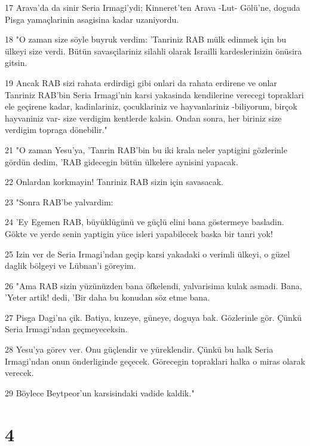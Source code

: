 \par 17 Arava'da da sinir Seria Irmagi'ydi; Kinneret'ten Arava -Lut- Gölü'ne, doguda Pisga yamaçlarinin asagisina kadar uzaniyordu.
\par 18 "O zaman size söyle buyruk verdim: 'Tanriniz RAB mülk edinmek için bu ülkeyi size verdi. Bütün savasçilariniz silahli olarak Israilli kardeslerinizin önüsira gitsin.
\par 19 Ancak RAB sizi rahata erdirdigi gibi onlari da rahata erdirene ve onlar Tanriniz RAB'bin Seria Irmagi'nin karsi yakasinda kendilerine verecegi topraklari ele geçirene kadar, kadinlariniz, çocuklariniz ve hayvanlariniz -biliyorum, birçok hayvaniniz var- size verdigim kentlerde kalsin. Ondan sonra, her biriniz size verdigim topraga dönebilir."
\par 21 "O zaman Yesu'ya, 'Tanrin RAB'bin bu iki krala neler yaptigini gözlerinle gördün dedim, 'RAB gidecegin bütün ülkelere aynisini yapacak.
\par 22 Onlardan korkmayin! Tanriniz RAB sizin için savasacak.
\par 23 "Sonra RAB'be yalvardim:
\par 24 'Ey Egemen RAB, büyüklügünü ve güçlü elini bana göstermeye basladin. Gökte ve yerde senin yaptigin yüce isleri yapabilecek baska bir tanri yok!
\par 25 Izin ver de Seria Irmagi'ndan geçip karsi yakadaki o verimli ülkeyi, o güzel daglik bölgeyi ve Lübnan'i göreyim.
\par 26 "Ama RAB sizin yüzünüzden bana öfkelendi, yalvarisima kulak asmadi. Bana, 'Yeter artik! dedi, 'Bir daha bu konudan söz etme bana.
\par 27 Pisga Dagi'na çik. Batiya, kuzeye, güneye, doguya bak. Gözlerinle gör. Çünkü Seria Irmagi'ndan geçmeyeceksin.
\par 28 Yesu'ya görev ver. Onu güçlendir ve yüreklendir. Çünkü bu halk Seria Irmagi'ndan onun önderliginde geçecek. Görecegin topraklari halka o miras olarak verecek.
\par 29 Böylece Beytpeor'un karsisindaki vadide kaldik."

\chapter{4}

